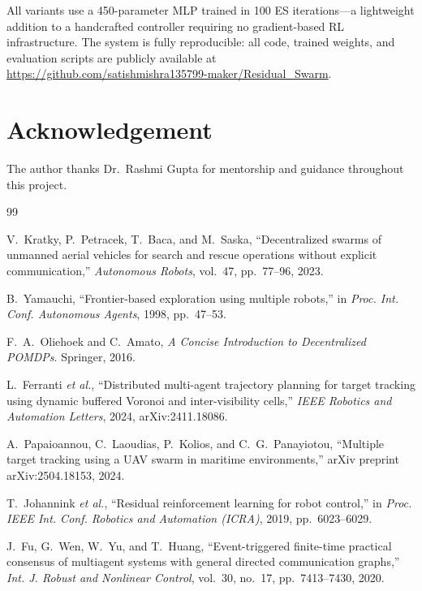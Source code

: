 \documentclass[journal]{IEEEtran}
\begin{document}
All variants use a 450-parameter MLP trained in 100 ES iterations---a lightweight
addition to a handcrafted controller requiring no gradient-based RL infrastructure.
The system is fully reproducible: all code, trained weights, and evaluation scripts
are publicly available at \url{https://github.com/satishmishra135799-maker/Residual_Swarm}.

\section*{Acknowledgement}
The author thanks Dr.~Rashmi Gupta for mentorship and guidance throughout this project.

\begin{thebibliography}{99}

V.~Kratky, P.~Petracek, T.~Baca, and M.~Saska,
``Decentralized swarms of unmanned aerial vehicles for search and rescue operations without explicit communication,''
\emph{Autonomous Robots}, vol.~47, pp.~77--96, 2023.

B.~Yamauchi,
``Frontier-based exploration using multiple robots,''
in \emph{Proc. Int. Conf. Autonomous Agents}, 1998, pp.~47--53.

F.~A.~Oliehoek and C.~Amato,
\emph{A Concise Introduction to Decentralized POMDPs}.
Springer, 2016.

L.~Ferranti \emph{et al.},
``Distributed multi-agent trajectory planning for target tracking using dynamic buffered Voronoi and inter-visibility cells,''
\emph{IEEE Robotics and Automation Letters}, 2024, arXiv:2411.18086.

A.~Papaioannou, C.~Laoudias, P.~Kolios, and C.~G.~Panayiotou,
``Multiple target tracking using a UAV swarm in maritime environments,''
arXiv preprint arXiv:2504.18153, 2024.

T.~Johannink \emph{et al.},
``Residual reinforcement learning for robot control,''
in \emph{Proc. IEEE Int. Conf. Robotics and Automation (ICRA)}, 2019, pp.~6023--6029.

J.~Fu, G.~Wen, W.~Yu, and T.~Huang,
``Event-triggered finite-time practical consensus of multiagent systems with general directed communication graphs,''
\emph{Int. J. Robust and Nonlinear Control}, vol.~30, no.~17, pp.~7413--7430, 2020.


\end{thebibliography}
\end{document}
